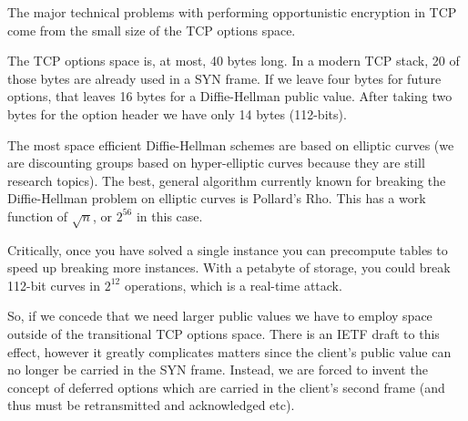 \documentclass[conference]{IEEEtran}
\begin{document}

The major technical problems with performing opportunistic encryption in TCP
come from the small size of the TCP options space.

The TCP options space is, at most, 40 bytes long. In a modern TCP stack, 20 of
those bytes are already used in a SYN frame. If we leave four bytes for future
options, that leaves 16 bytes for a Diffie-Hellman public value. After taking two
bytes for the option header we have only 14 bytes (112-bits).

The most space efficient Diffie-Hellman schemes are based on elliptic curves
(we are discounting groups based on hyper-elliptic curves\cite{edwards} because
they are still research topics). The best, general algorithm currently known
for breaking the Diffie-Hellman problem on elliptic curves is Pollard's Rho.
This has a work function of $\sqrt{n}$, or $2^{56}$ in this case.

Critically, once you have solved a single instance you can precompute tables to
speed up breaking more instances. With a petabyte of storage, you could break
112-bit curves in $2^{12}$ operations, which is a real-time attack.

So, if we concede that we need larger public values we have to employ space
outside of the transitional TCP options space. There is an IETF draft to this
effect\cite{tcploo}, however it greatly complicates matters since the client's public
value can no longer be carried in the SYN frame. Instead, we are forced to
invent the concept of deferred options which are carried in the client's second
frame (and thus must be retransmitted and acknowledged etc).






\end{document}
